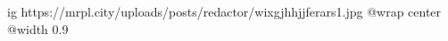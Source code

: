  
 
 
 
 

\ifcmt
  ig https://mrpl.city/uploads/posts/redactor/wixgjhhjjferars1.jpg
  @wrap center
  @width 0.9
\fi
